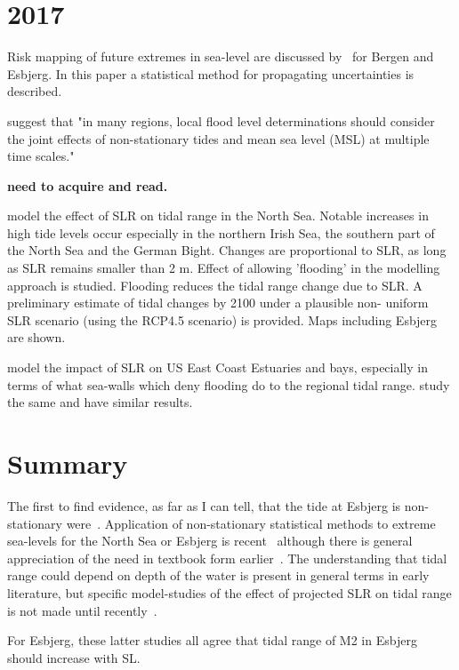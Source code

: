 \documentclass[12pt,a4]{article}
\begin{document}
\section{2017}
Risk mapping of future extremes in sea-level are discussed by~\cite{Thorarinsdottir2017} for Bergen and Esbjerg. In this paper a statistical method for propagating uncertainties is described.

\cite{Devlin2017c} suggest that "in many regions, local flood level determinations should consider the joint effects of non-stationary tides and mean sea level (MSL) at multiple time scales."

\cite{Kuang2017} \textbf{need to acquire and read.}

\cite{Idier2017} model the effect of SLR on tidal range in the North Sea. Notable increases in high tide levels occur especially in the northern Irish Sea, the southern part of the North Sea and the German Bight. Changes are proportional to SLR, as long as SLR remains smaller than 2 m. Effect of allowing 'flooding' in the modelling approach is studied. Flooding reduces the tidal range change due to SLR. A preliminary estimate of tidal changes by 2100 under a plausible non- uniform SLR scenario (using the RCP4.5 scenario) is provided. Maps including Esbjerg are shown.

\cite{Lee2017} model the impact of SLR on US East Coast Estuaries and bays, especially in terms of what sea-walls which deny flooding do to the regional tidal range. \cite{Ross17} study the same  and have similar results.

\section{Summary}

The first to find evidence, as far as I can tell, that the tide at Esbjerg is non-stationary were~\cite{Dimon1997a}. Application of non-stationary statistical methods to extreme sea-levels for the North Sea or Esbjerg is recent~\citep{Mudersbach2010} although there is general appreciation of the need in textbook form earlier~\citep{Coles2001}. The understanding that tidal range could depend on depth of the water is present in general terms in early literature, but  specific model-studies of the effect of projected SLR on tidal range is not made until recently~\cite{Pickering2012,Arns2015,Devlin2017c,Idier2017,Lee2017}.

For Esbjerg, these latter studies all agree that tidal range of M2 in Esbjerg should increase with SL.

 



\end{document}
